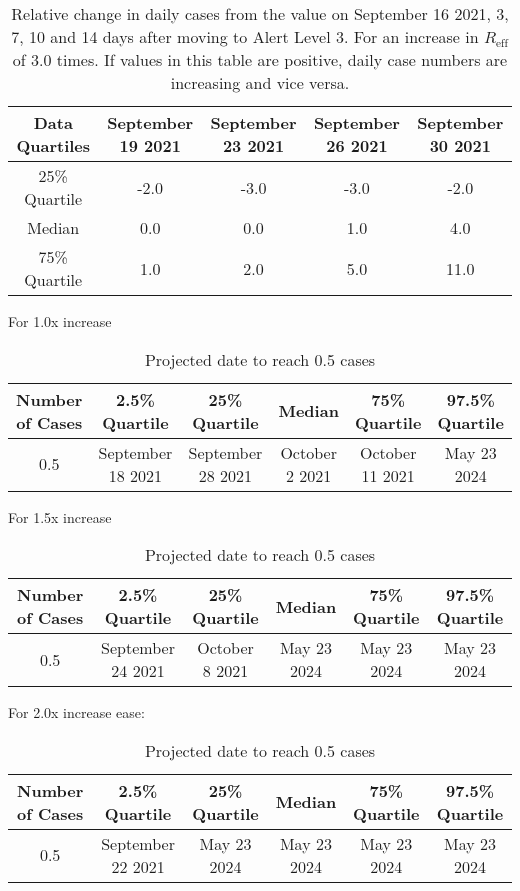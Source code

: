 \begin{table}[h] 
 \centering 
 \begin{tabular}{c|c|c|c|c}
Data Quartiles & September 19 2021 & September 23 2021 & September 26 2021 & September 30 2021\\
\hline
25\% Quartile & -2.0 & -3.0 & -3.0 & -2.0\\
Median & 0.0 & 0.0 & 1.0 & 4.0\\
75\% Quartile & 1.0 & 2.0 & 5.0 & 11.0\\
\end{tabular}
\caption{Relative change in daily cases from the value on September 16 2021, 3, 7, 10 and 14 days after moving to Alert Level 3. For an increase in $R_\text{eff}$ of 3.0 times. If values in this table are positive, daily case numbers are increasing and vice versa.}
\label{tab:BP_predicted_cases_3.0}
\end{table}
For 1.0x increase

\begin{table}[h] 
 \centering 
 \begin{tabular}{c|c|c|c|c|c}
Number of Cases & 2.5\% Quartile & 25\% Quartile & Median & 75\% Quartile & 97.5\% Quartile \\
\hline
0.5 & September 18 2021 & September 28 2021 & October 2 2021 & October 11 2021 & May 23 2024\\
\end{tabular}
\caption{Projected date to reach 0.5 cases}
\label{tab:BP_date_to_reach_cases}
\end{table}
For 1.5x increase

\begin{table}[h] 
 \centering 
 \begin{tabular}{c|c|c|c|c|c}
Number of Cases & 2.5\% Quartile & 25\% Quartile & Median & 75\% Quartile & 97.5\% Quartile \\
\hline
0.5 & September 24 2021 & October 8 2021 & May 23 2024 & May 23 2024 & May 23 2024\\
\end{tabular}
\caption{Projected date to reach 0.5 cases}
\label{tab:BP_date_to_reach_cases}
\end{table}
For 2.0x increase
ease:

\begin{table}[h] 
 \centering 
 \begin{tabular}{c|c|c|c|c|c}
Number of Cases & 2.5\% Quartile & 25\% Quartile & Median & 75\% Quartile & 97.5\% Quartile \\
\hline
0.5 & September 22 2021 & May 23 2024 & May 23 2024 & May 23 2024 & May 23 2024\\
\end{tabular}
\caption{Projected date to reach 0.5 cases}
\label{tab:BP_date_to_reach_cases}
\end{table}

